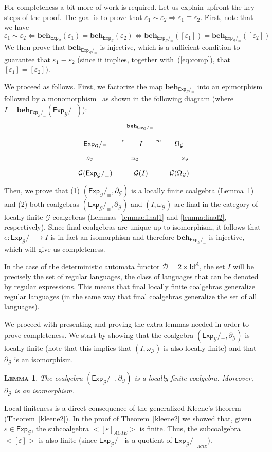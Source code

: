 \documentclass{LMCS}
\newcommand\D{\mathcal{D}}
\newcommand\E\varepsilon
\newcommand\Exp{\mathsf{Exp}}
\newcommand\id{\mathsf{Id}}
\newcommand\G{\mathcal{G}}
\theoremstyle{definition}
\theoremstyle{plain}
\newtheorem{mylemma}[mydefinition]{\textsc{Lemma}}
\theoremstyle{plain}
\theoremstyle{plain}
\theoremstyle{plain}
\theoremstyle{definition}
\theoremstyle{definition}
\newenvironment{lemma}{
\begin{mylemma}}
    {\end{mylemma}}
\begin{document}
For completeness a bit more of work is required. Let us explain
upfront the key steps of the proof. The goal is to prove that 
$\E_1\sim \E_2 \Rightarrow \E_1\equiv \E_2$.
First, note that we have 
\begin{equation}\label{eq:comp}
\E_1\sim \E_2 \Leftrightarrow \mathbf{beh}_{\Exp_{\G}}(\E_1)
=  \mathbf{beh}_{\Exp_{\G}}(\E_2)\Leftrightarrow \mathbf{beh}_{\Exp_\G/_{\equiv}}([\E_1])=
\mathbf{beh}_{\Exp_\G/_{\equiv}}([\E_2])
\end{equation}
We then prove that $\mathbf{beh}_{\Exp_\G/_{\equiv}}$ is injective, which
is a sufficient condition to guarantee that $\E_1\equiv \E_2$ (since
it implies, together with~(\ref{eq:comp}), that $[\E_1]=[\E_2]$).

We proceed as follows. First, we factorize
 the map $\mathbf{beh}_{\Exp_\G/_{\equiv}}$ into an epimorphism followed by a
monomorphism~\cite[Theorem 7.1]{Rutten00} as shown in the following
diagram (where $I= \mathbf{beh}_{\Exp_\G/_{\equiv}}(\Exp_\G/_{\equiv})$):
\[
\xymatrix{
\Exp_\G/_{\equiv}\ar@{-->}@/{}^{1.4pc}/[rr]^-{\mathbf{beh}_{\Exp_\G/_{\equiv}}}
\ar@{>>}[r]^-{e}
\ar[d]_{\partial_{\G}} &
I\ar@{^{(}->}[r]^-{m} \ar[d]_{\overline\omega_\G} &
\Omega_\G\ar[d]^{\omega_\G}\\
\G(\Exp_\G/_{\equiv})\ar[r]& \G(I)\ar[r]
& \G(\Omega_\G)\\
}
\]
Then, we prove that (1) $(\Exp_\G/_{\equiv}, \partial_{\G})$ is a locally
finite coalgebra (Lemma~\ref{lemma:h_locally_finite}) and (2) both
coalgebras $(\Exp_\G/_{\equiv}, \partial_{\G})$ and $(I,
\overline\omega_\G)$ are final in the category of locally finite $\G$-coalgebras
(Lemmas~\ref{lemma:final1} and \ref{lemma:final2}, respectively).
Since final coalgebras are unique up to isomorphism, it follows that
$e\colon \Exp_\G/_{\equiv}\to I$
is in fact an isomorphism and therefore $\mathbf{beh}_{\Exp_\G/_{\equiv}}$ is injective, which will give us completeness.

In the case of the deterministic
automata functor $\D=2\times \id^A$, the set $I$ will be precisely the
set of regular languages, the class of languages that can be denoted
by regular expressions. This means that final locally finite
coalgebras generalize regular languages (in the same way that final coalgebras
generalize the set of all languages). 

We proceed with presenting and proving the extra lemmas needed in
order to prove completeness. We start by showing that the coalgebra 
$(\Exp_\G/_{\equiv}, \partial_{\G})$ is locally finite (note
that this implies that $(I,
\overline\omega_\G)$ is also locally finite) and that $\partial_{\G}$ is
an isomorphism. 
\begin{lemma}\label{lemma:h_locally_finite}
The coalgebra $(\Exp_\G/_{\equiv}, \partial_{\G})$ is a locally finite coalgebra.
Moreover, $\partial_{\G}$ is an isomorphism.
\end{lemma}
\proof 
Local finiteness
is a direct consequence of the generalized Kleene's theorem
(Theorem~\ref{kleene2}). In the proof of Theorem~\ref{kleene2} we showed that, 
given $\E\in \Exp_{\G}$, the
subcoalgebra $<[\E]_{\mathit{ACIE}}>$ is finite. Thus, the
subcoalgebra $<[\E]>$ is also finite (since $\Exp_\G/_\equiv$ is a
quotient of $\Exp_\G/_{\equiv_{ACIE}}$). 
\end{document}
